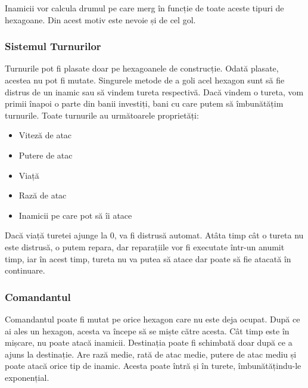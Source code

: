\documentclass[12pt, a4paper]{article}
\begin{document}
	Inamicii vor calcula drumul pe care merg în funcție de toate aceste tipuri de hexagoane. Din acest motiv este nevoie și de cel gol.
	


	
	
	
	\subsubsection{Sistemul Turnurilor}
	
	Turnurile pot fi plasate doar pe hexagoanele de construcție. Odată plasate, acestea nu pot fi mutate. Singurele metode de a goli acel hexagon sunt să fie distrus de un inamic sau să vindem tureta respectivă. Dacă vindem o tureta, vom primii înapoi o parte din banii investiți, bani cu care putem să îmbunătățim turnurile. Toate turnurile au următoarele proprietăți:
	\begin{itemize}
		\item Viteză de atac
		\item Putere de atac
		\item Viață
		\item Rază de atac
		\item Inamicii pe care pot să îi atace
	\end{itemize}
	
	Dacă viață turetei ajunge la 0, va fi distrusă automat. Atâta timp cât o tureta nu este distrusă, o putem repara, dar reparațiile vor fi executate într-un anumit timp, iar în acest timp, tureta nu va putea să atace dar poate să fie atacată în continuare.
	
	
	
	
	
	\subsubsection{Comandantul}
	
	Comandantul poate fi mutat pe orice hexagon care nu este deja ocupat. După ce ai ales un hexagon, acesta va începe să se miște către acesta. Cât timp este în mișcare, nu poate atacă inamicii. Destinația poate fi schimbată doar după ce a ajuns la destinație. Are rază medie, rată de atac medie, putere de atac mediu și poate atacă orice tip de inamic. Acesta poate întră și în turete, îmbunătățindu-le exponențial.
	
\end{document}
